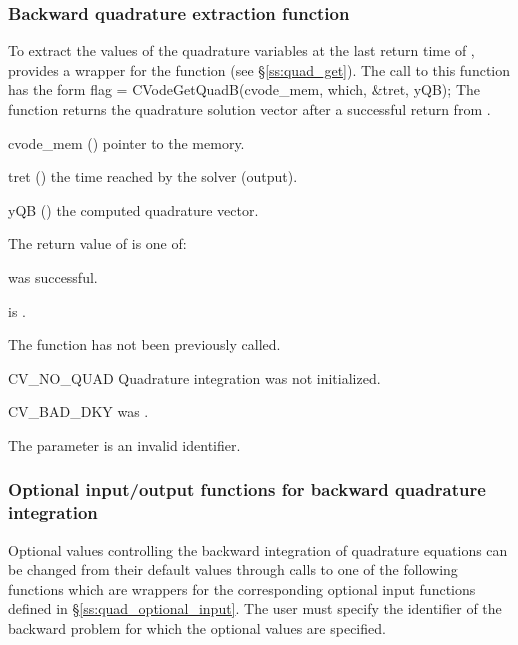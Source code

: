 \subsubsection{Backward quadrature extraction function}
\label{sss:quad_get_b}
To extract the values of the quadrature variables at the last return time
of , {\cvodes} provides a wrapper for the function 
(see \S\ref{ss:quad_get}). The call to this function has the form
{
  flag = CVodeGetQuadB(cvode\_mem, which, \&tret, yQB);
}
{
  The function  returns the quadrature solution vector after
  a successful return from .
}
{
  \begin{args}
  \item[cvode\_mem] ()
    pointer to the {\cvodes} memory.
  \item[tret] ()
    the time reached by the solver (output).
  \item[yQB] ()
    the computed quadrature vector.
  \end{args}
}
{
  The return value  of  is one of:
  \begin{args}
  \item[\Id{CV\_SUCCESS}] 
     was successful.
  \item[\Id{CV\_MEM\_NULL}] 
     is .
  \item[\Id{CV\_NO\_ADJ}]
    The function  has not been previously called.
  \item[CV\_NO\_QUAD] 
    Quadrature integration was not initialized.
  \item[CV\_BAD\_DKY] 
     was .
  \item[\Id{CV\_ILL\_INPUT}]
    The parameter  is an invalid identifier.
  \end{args}
}
{}

\subsubsection{Optional input/output functions for backward quadrature integration}
\label{sss:quad_optional_input_B}
Optional values controlling the backward integration of quadrature equations can be 
changed from their default values through calls to one of the following functions 
which are wrappers for the corresponding optional input functions defined in 
\S\ref{ss:quad_optional_input}. The user must specify  the identifier  
of the backward problem for which the optional values are specified.


